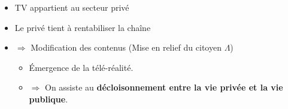 \documentclass[11pt]{article}
\begin{document}
\begin{enumerate}
\begin{enumerate}
\begin{enumerate}
\begin{itemize}
\begin{enumerate}
\begin{itemize}
\begin{itemize}
\item TV appartient au secteur privé
\item Le privé tient à rentabiliser la chaîne
\item \(\Rightarrow\) Modification des contenus (Mise en relief du citoyen \(\Lambda\))
\begin{itemize}
\item Émergence de la télé-réalité.
\item \(\Rightarrow\) On assiste au \textbf{décloisonnement entre la vie privée et la vie
publique}.
\end{itemize}
\end{itemize}
\end{itemize}
\end{enumerate}
\end{itemize}
\end{enumerate}
\end{enumerate}
\end{enumerate}
\end{document}
